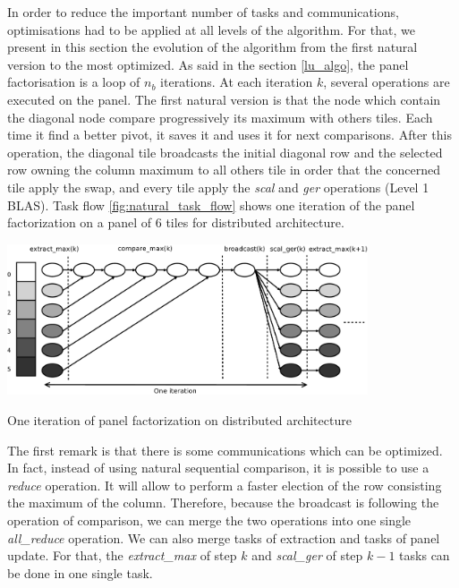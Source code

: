 In order to reduce the important number of tasks and communications, optimisations had to be applied at all levels of the algorithm. For that, we present in this section the evolution of the algorithm from the first natural version to the most optimized. As said in the section \ref{lu_algo}, the panel factorisation is a loop of $n_b$ iterations. At each iteration $k$, several operations are executed on the panel.
The first natural version is that the node which contain the diagonal node compare progressively its maximum with others tiles. Each time it find a better pivot, it saves it and uses it for next comparisons. After this operation, the diagonal tile broadcasts the initial diagonal row and the selected row owning the column maximum to all others tile in order that the concerned tile apply the swap, and every tile apply the \emph{scal} and \emph{ger} operations (Level 1 BLAS). Task flow \ref{fig:natural_task_flow} shows one iteration of the panel factorization on a panel of 6 tiles for distributed architecture.

\begin{taskflow}[!ht]
\centering
\includegraphics[width=0.8\textwidth]{figures/natural_tf_bw.pdf}
\caption{One iteration of panel factorization on distributed architecture \label{fig:natural_task_flow}}
\end{taskflow}

The first remark is that there is some communications which can be optimized. In fact, instead of using natural sequential comparison, it is possible to use a \emph{reduce} operation. It will allow to perform a faster election of the row consisting the maximum of the column. Therefore, because the broadcast is following the operation of comparison, we can merge the two operations into one single \emph{all\_reduce} operation.
We can also merge tasks of extraction and tasks of panel update. For that, the \emph{extract\_max} of step $k$ and \emph{scal\_ger} of step $k-1$ tasks can be done in one single task.

